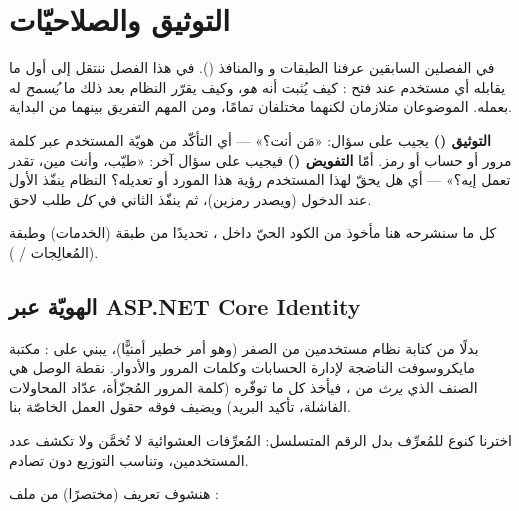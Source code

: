 \section{التوثيق والصلاحيّات}

في الفصلين السابقين عرفنا الطبقات و والمنافذ (). في هذا الفصل
ننتقل إلى أول ما يقابله أي مستخدم عند فتح : كيف يُثبت أنه \emph{هو}،
وكيف يقرّر النظام بعد ذلك ما \emph{يُسمح} له بعمله. الموضوعان متلازمان لكنهما مختلفان
تمامًا، ومن المهم التفريق بينهما من البداية.

\begin{idea}
\textbf{التوثيق ()} يجيب على سؤال: «مَن أنت؟» — أي التأكّد من
هويّة المستخدم عبر كلمة مرور أو حساب  أو رمز.
أمّا \textbf{التفويض ()} فيجيب على سؤال آخر: «طيّب، وأنت مين، تقدر
تعمل إيه؟» — أي هل يحقّ لهذا المستخدم رؤية هذا المورد أو تعديله؟
النظام ينفّذ الأول عند الدخول (ويصدر رمزين)، ثم ينفّذ الثاني في \emph{كل} طلب لاحق.
\end{idea}

كل ما سنشرحه هنا مأخوذ من الكود الحيّ داخل ، تحديدًا من طبقة
 (الخدمات) وطبقة  (المُعالِجات / ).

\subsection{الهويّة عبر ASP.NET Core Identity}

بدلًا من كتابة نظام مستخدمين من الصفر (وهو أمر خطير أمنيًّا)، يبني 
على : مكتبة مايكروسوفت الناضجة لإدارة الحسابات وكلمات المرور
والأدوار. نقطة الوصل هي الصنف  الذي \emph{يرث} من
، فيأخذ كل ما توفّره  (كلمة المرور المُجزّأة،
عدّاد المحاولات الفاشلة، تأكيد البريد) ويضيف فوقه حقول العمل الخاصّة بنا.

\begin{note}
اخترنا  كنوع للمُعرِّف بدل الرقم المتسلسل: المُعرِّفات العشوائية لا تُخمَّن
ولا تكشف عدد المستخدمين، وتناسب التوزيع دون تصادم.
\end{note}

هنشوف تعريف  (مختصرًا) من ملف :

